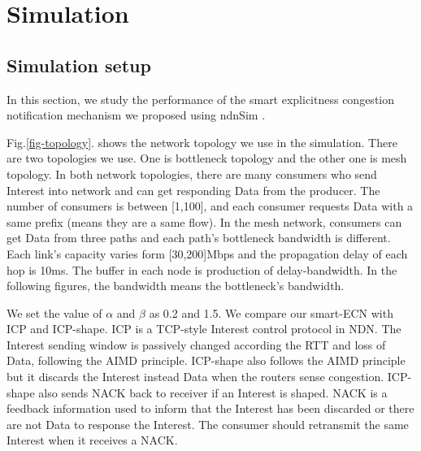 
\section{Simulation}

\label{sec:simulation}

\subsection{Simulation setup}
In this section, we study the performance of the smart explicitness congestion notification mechanism we proposed using ndnSim\cite{ndnsimnet} \cite{ndnsim}.

Fig.\ref{fig-topology}. shows the network topology we use in the simulation. There are two topologies we use. One is bottleneck topology and the other one is mesh topology. In both network topologies, there are many consumers who send Interest into network and can get responding Data from the producer. The number of consumers is between [1,100], and each consumer requests Data with a same prefix (means they are a same flow). In the mesh network, consumers can get Data from three paths and each path's bottleneck bandwidth is different. Each link's capacity varies form [30,200]Mbps and the propagation delay of each hop is 10ms. The buffer in each node is production of delay-bandwidth. In the following figures, the bandwidth means the bottleneck's bandwidth.

We set the value of $\alpha$ and $\beta$ as 0.2 and 1.5. We compare our smart-ECN with ICP and ICP-shape. ICP is a TCP-style Interest control protocol in NDN. The Interest sending window is passively changed according the RTT and loss of Data, following the AIMD principle\cite{ICP}. ICP-shape also follows the AIMD principle but it discards the Interest instead Data when the routers sense congestion\cite{improveshape}. ICP-shape also sends NACK back to receiver if an Interest is shaped. NACK is a feedback information used to inform that the Interest has been discarded or there are not Data to response the Interest. The consumer should retransmit the same Interest when it receives a NACK.

